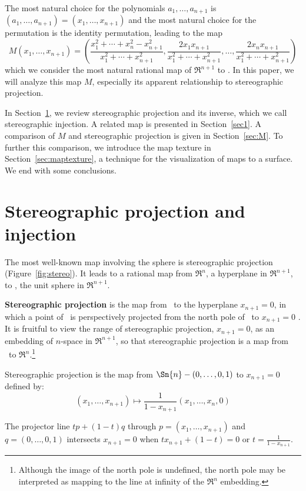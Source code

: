 The most natural choice for the polynomials $a_1,\ldots,a_{n+1}$
is $(a_1,\ldots,a_{n+1}) = (x_1,\ldots,x_{n+1})$
and the most natural choice for the permutation is the identity permutation,
leading to the map
\begin{equation}
\label{eq:Mmap}
	M(x_1,\ldots,x_{n+1}) = 
	(\frac{x_1^2 + \cdots + x_{n}^2 - x_{n+1}^2}{x_1^2 + \cdots + x_{n+1}^2},
	 \frac{2x_1x_{n+1}}{x_1^2 + \cdots + x_{n+1}^2},\ldots,
	 \frac{2x_{n}x_{n+1}}{x_1^2 + \cdots + x_{n+1}^2})
\end{equation}
which we consider the most natural rational map of $\Re^{n+1}$ to .
In this paper, we will analyze this map $M$, especially its apparent
relationship to stereographic projection.

In Section~\ref{sec:stereo}, we review stereographic projection and its inverse,
which we call stereographic injection.
A related map is presented in Section~\ref{sec1}.
A comparison of $M$ and stereographic projection is given in Section~\ref{sec:M}.
To further this comparison, 
we introduce the map texture in Section~\ref{sec:maptexture}, 
a technique for the visualization of maps to a surface.
We end with some conclusions.


\section{Stereographic projection and injection}
\label{sec:stereo}

The most well-known map involving the sphere is
stereographic projection (Figure~\ref{fig:stereo}).
It leads to a rational map from $\Re^n$, a hyperplane in $\Re^{n+1}$,
to , the unit sphere in $\Re^{n+1}$.

\begin{defn2}
{\bf Stereographic projection} is the map from \ 
to the hyperplane $x_{n+1}=0$,
in which a point of \ is perspectively projected from 
the north pole of \Sn{n}\ to $x_{n+1}=0$ \cite{thorpe79}.	%
It is fruitful to view the range of stereographic projection, $x_{n+1}=0$, 
as an embedding of $n$-space in $\Re^{n+1}$, so that stereographic projection
is a map from \Sn{n}\ to $\Re^n$.\footnote{Although the image of the north 
	pole is undefined, the north pole may be interpreted
	as mapping to the line at infinity of the $\Re^n$ embedding.}
\end{defn2}

\begin{lemma}
Stereographic projection is the map from 
$\Sn{n} - (0,\ldots,0,1)$ to $x_{n+1}=0$ defined by:
\[ (x_1,\ldots,x_{n+1}) \mapsto \frac{1}{1-x_{n+1}} (x_1,\ldots,x_n,0) \]
\end{lemma}
\prf
The projector line $tp + (1-t)q$ through $p = (x_1,\ldots,x_{n+1})$ 
and $q = (0,\ldots,0,1)$ intersects $x_{n+1}=0$ 
when $tx_{n+1} + (1-t) = 0$ or $t = \frac{1}{1-x_{n+1}}$.
\QED

